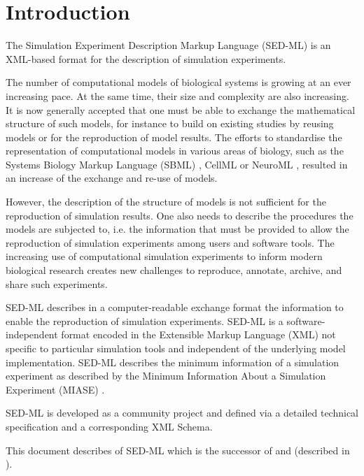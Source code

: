 \chapter{Introduction}
The Simulation Experiment Description Markup Language (SED-ML) is an XML-based format for the description of simulation experiments.

The number of computational models of biological systems is growing at an ever increasing pace. 
At the same time, their size and complexity are also increasing. It is now generally accepted that one must be able to exchange the mathematical structure of such models, for instance to build on existing studies by reusing models or for the reproduction of model results. The efforts to standardise the representation of computational models in various areas of biology, such as the Systems Biology Markup Language (SBML) \citep{Hucka:2003}, CellML \citep{cuellar:2003} or NeuroML \citep{Goddard:2001}, resulted in an increase of the exchange and re-use of models. 

However, the description of the structure of models is not sufficient for the reproduction of simulation results. One also needs to describe the procedures the models are subjected to, i.e. the information that must be provided to allow the reproduction of simulation experiments among users and software tools. The increasing use of computational simulation experiments to inform modern biological research creates new challenges to reproduce, annotate, archive, and share such experiments. 

SED-ML describes in a computer-readable exchange format the information to enable the reproduction of simulation experiments. SED-ML is a software-independent format encoded in the Extensible Markup Language (XML) not specific to particular simulation tools and independent of the underlying model implementation. SED-ML describes the minimum information of a simulation experiment as described by the Minimum Information About a Simulation Experiment (MIASE) \citep{Waltemath:2011}.

SED-ML is developed as a community project and defined via a detailed technical specification and a corresponding XML Schema. 

This document describes \currentLV of SED-ML which is the successor of \previousLV and \LoneVone (described in \citep{WAB+11}).


